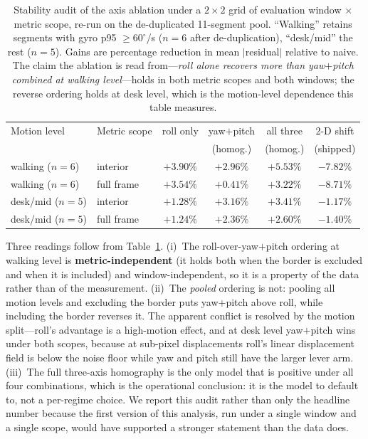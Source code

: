 \documentclass[12pt,a4paper]{article}
\begin{document}
\begin{table}[htbp]
  \centering
  \small
  \caption{Stability audit of the axis ablation under a $2\times2$ grid of evaluation window $\times$ metric scope, re-run on the de-duplicated 11-segment pool. ``Walking'' retains segments with gyro p95 $\ge 60^\circ$/s ($n{=}6$ after de-duplication), ``desk/mid'' the rest ($n{=}5$). Gains are percentage reduction in mean $|$residual$|$ relative to naive. The claim the ablation is read from---\emph{roll alone recovers more than yaw$+$pitch combined at walking level}---holds in both metric scopes and both windows; the reverse ordering holds at desk level, which is the motion-level dependence this table measures.}
  \label{tab:axis-stability}
  \begin{tabular}{llcccc}
    \toprule
    Motion level & Metric scope & roll only & yaw$+$pitch & all three & 2-D shift \\
     & & & (homog.) & (homog.) & (shipped) \\
    \midrule
    walking ($n{=}6$) & interior & $\mathbf{+3.90\%}$ & $+2.96\%$ & $\mathbf{+5.53\%}$ & $-7.82\%$ \\
    walking ($n{=}6$) & full frame & $\mathbf{+3.54\%}$ & $+0.41\%$ & $+3.22\%$ & $-8.71\%$ \\
    \midrule
    desk/mid ($n{=}5$) & interior & $+1.28\%$ & $\mathbf{+3.16\%}$ & $+3.41\%$ & $-1.17\%$ \\
    desk/mid ($n{=}5$) & full frame & $+1.24\%$ & $\mathbf{+2.36\%}$ & $+2.60\%$ & $-1.40\%$ \\
    \bottomrule
  \end{tabular}
\end{table}

Three readings follow from Table~\ref{tab:axis-stability}. (i)~The roll-over-yaw$+$pitch ordering at walking level is \textbf{metric-independent} (it holds both when the border is excluded and when it is included) and window-independent, so it is a property of the data rather than of the measurement. (ii)~The \emph{pooled} ordering is not: pooling all motion levels and excluding the border puts yaw$+$pitch above roll, while including the border reverses it. The apparent conflict is resolved by the motion split---roll's advantage is a high-motion effect, and at desk level yaw$+$pitch wins under both scopes, because at sub-pixel displacements roll's linear displacement field is below the noise floor while yaw and pitch still have the larger lever arm. (iii)~The full three-axis homography is the only model that is positive under all four combinations, which is the operational conclusion: it is the model to default to, not a per-regime choice. We report this audit rather than only the headline number because the first version of this analysis, run under a single window and a single scope, would have supported a stronger statement than the data does.
\end{document}

